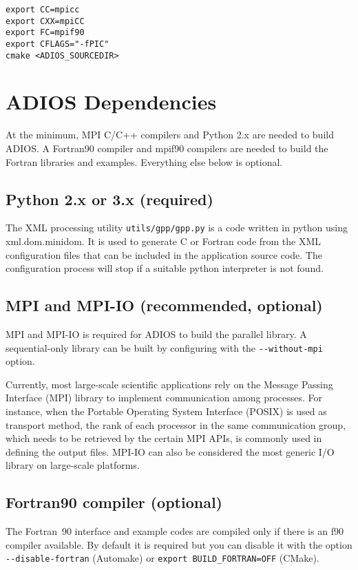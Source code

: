 \begin{lstlisting}
export CC=mpicc
export CXX=mpiCC
export FC=mpif90
export CFLAGS="-fPIC"
cmake <ADIOS_SOURCEDIR>
\end{lstlisting}


\section{ADIOS Dependencies}
At the minimum, MPI C/C++ compilers and Python 2.x are needed to build ADIOS. 
A Fortran90 compiler and mpif90 compilers are needed to build the Fortran libraries and examples. 
Everything else below is optional.

\subsection{Python 2.x or 3.x (required)}

The XML processing utility \verb+utils/gpp/gpp.py+ is a code written in python using xml.dom.minidom.
It is used to generate C or Fortran code from the XML configuration files that
can be included in the application source code.  The configuration process will stop if a suitable python interpreter is not found. 

\subsection{MPI and MPI-IO (recommended, optional)}

MPI and MPI-IO is required for ADIOS to build the parallel library. 
A sequential-only library can be built by configuring with the \verb+--without-mpi+ option.

Currently, most large-scale scientific applications rely on the Message Passing
Interface (MPI) library to implement communication among processes. For instance,
when the Portable Operating System Interface (POSIX) is used as transport method,
the rank of each processor in the same communication group, which needs to be retrieved
by the certain MPI APIs, is commonly used in defining the output files. MPI-IO
can also be considered the most generic I/O library on large-scale platforms.


\subsection{Fortran90 compiler (optional)}

The Fortran~90 interface and example codes are compiled only if there is an f90
compiler available. By default it is required but you can disable it with the option
\verb+--disable-fortran+ (Automake) or
\linebreak \verb+export BUILD_FORTRAN=OFF+ (CMake).


